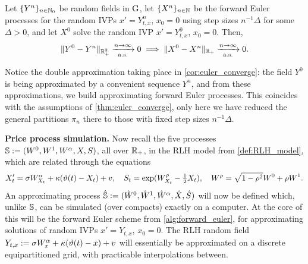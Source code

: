 \begin{corollary}\label{cor:euler_converge}
    Let $\{Y^n\}_{n\in\mathbb{N}_0}$ be random fields in $\mathrm{G}$, let $\{X^n\}_{n\in\mathbb{N}}$ be the forward Euler processes for the random IVPs $x'=Y^n_{t,x}$, $x_0=0$ using step sizes $n^{-1}\Delta$ for some $\Delta>0$, and let $X^0$ solve the random IVP $x'=Y^0_{t,x}$, $x_0=0$. Then,
    \begin{equation}
        \Vert Y^0 - Y^n \Vert_{\mathbb{R}_+^2} \xrightarrow[\mathrm{a.s.}]{n\to\infty} 0 \implies \Vert X^0 - X^n\Vert_{\mathbb{R}_+} \xrightarrow[\mathrm{a.s.}]{n\to\infty} 0.
    \end{equation}
\end{corollary}

Notice the double approximation taking place in \autoref{cor:euler_converge}: the field $Y^0$ is being approximated by a convenient sequence $Y^n$, and from these approximations, we build approximating forward Euler processes. This coincides with the assumptions of  \autoref{thm:euler_converge}, only here we have reduced the general partitions $\pi_n$ there to those with fixed step sizes $n^{-1}\Delta$.

\vspace{3mm}\textbf{Price process simulation.} Now recall the five processes $\mathbb{S}:=(W^0,W^1,W^\alpha,X,S)$, all over $\mathbb{R}_+$, in the RLH model from \autoref{def:RLH_model}, which are related through the equations
\begin{equation}
    X'_t = \sigma W^\alpha_{X_t} + \kappa(\vartheta(t) - X_t)+v,\quad S_t=\exp(W^\rho_{X_t}-\tfrac12 X_t),\quad W^\rho = \sqrt{1-\rho^2}W^0 + \rho W^1.
\end{equation}
An approximating process $\hat{\mathbb{S}}:=({\hat{W}}^0,{\hat{W}}^1,{\hat{W}}^\alpha,{\hat{X}},{\hat{S}})$ will now be defined which, unlike $\mathbb{S}$, can be simulated (over compacts) exactly on a computer. At the core of this will be the forward Euler scheme from \autoref{alg:forward_euler}, for approximating solutions of random IVPs $x'=Y_{t,x}$, $x_0=0$. The RLH random field $Y_{t,x}:=\sigma W^\alpha_x+\kappa(\vartheta(t)-x)+v$ will essentially be approximated on a discrete equipartitioned grid, with practicable interpolations between.

